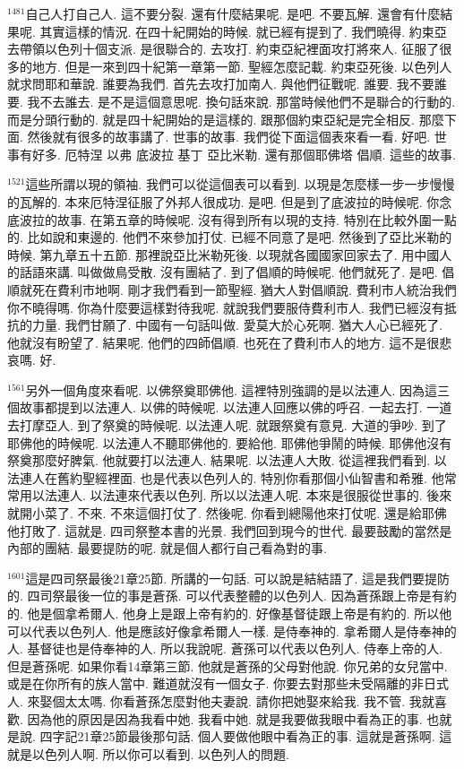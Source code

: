 \documentclass{book}
\begin{document}
$^{1481}$自己人打自己人.
這不要分裂.
還有什麼結果呢.
是吧.
不要瓦解.
還會有什麼結果呢.
其實這樣的情況.
在四十紀開始的時候.
就已經有提到了.
我們曉得.
約束亞去帶領以色列十個支派.
是很聯合的.
去攻打.
約束亞紀裡面攻打將來人.
征服了很多的地方.
但是一來到四十紀第一章第一節.
聖經怎麼記載.
約束亞死後.
以色列人就求問耶和華說.
誰要為我們.
首先去攻打加南人.
與他們征戰呢.
誰要.
我不要誰要.
我不去誰去.
是不是這個意思呢.
換句話來說.
那當時候他們不是聯合的行動的.
而是分頭行動的.
就是四十紀開始的是這樣的.
跟那個約束亞紀是完全相反.
那麼下面.
然後就有很多的故事講了.
世事的故事.
我們從下面這個表來看一看.
好吧.
世事有好多.
厄特涅 以弗 底波拉 基丁 亞比米勒.
還有那個耶佛塔 倡順.
這些的故事.

$^{1521}$這些所謂以現的領袖.
我們可以從這個表可以看到.
以現是怎麼樣一步一步慢慢的瓦解的.
本來厄特涅征服了外邦人很成功.
是吧.
但是到了底波拉的時候呢.
你念底波拉的故事.
在第五章的時候呢.
沒有得到所有以現的支持.
特別在比較外圍一點的.
比如說和東邊的.
他們不來參加打仗.
已經不同意了是吧.
然後到了亞比米勒的時候.
第九章五十五節.
那裡說亞比米勒死後.
以現就各國國家回家去了.
用中國人的話語來講.
叫做做鳥受散.
沒有團結了.
到了倡順的時候呢.
他們就死了.
是吧.
倡順就死在費利市地啊.
剛才我們看到一節聖經.
猶大人對倡順說.
費利市人統治我們你不曉得嗎.
你為什麼要這樣對待我呢.
就說我們要服侍費利市人.
我們已經沒有抵抗的力量.
我們甘願了.
中國有一句話叫做.
愛莫大於心死啊.
猶大人心已經死了.
他就沒有盼望了.
結果呢.
他們的四師倡順.
也死在了費利市人的地方.
這不是很悲哀嗎.
好.

$^{1561}$另外一個角度來看呢.
以佛祭奠耶佛他.
這裡特別強調的是以法連人.
因為這三個故事都提到以法連人.
以佛的時候呢.
以法連人回應以佛的呼召.
一起去打.
一道去打摩亞人.
到了祭奠的時候呢.
以法連人呢.
就跟祭奠有意見.
大道的爭吵.
到了耶佛他的時候呢.
以法連人不聽耶佛他的.
要給他.
耶佛他爭鬧的時候.
耶佛他沒有祭奠那麼好脾氣.
他就要打以法連人.
結果呢.
以法連人大敗.
從這裡我們看到.
以法連人在舊約聖經裡面.
也是代表以色列人的.
特別你看那個小仙智書和希雅.
他常常用以法連人.
以法連來代表以色列.
所以以法連人呢.
本來是很服從世事的.
後來就開小菜了.
不來.
不來這個打仗了.
然後呢.
你看到總陽他來打仗呢.
還是給耶佛他打敗了.
這就是.
四司祭整本書的光景.
我們回到現今的世代.
最要鼓勵的當然是內部的團結.
最要提防的呢.
就是個人都行自己看為對的事.

$^{1601}$這是四司祭最後21章25節.
所講的一句話.
可以說是結結語了.
這是我們要提防的.
四司祭最後一位的事是蒼孫.
可以代表整體的以色列人.
因為蒼孫跟上帝是有約的.
他是個拿希爾人.
他身上是跟上帝有約的.
好像基督徒跟上帝是有約的.
所以他可以代表以色列人.
他是應該好像拿希爾人一樣.
是侍奉神的.
拿希爾人是侍奉神的人.
基督徒也是侍奉神的人.
所以我說呢.
蒼孫可以代表以色列人.
侍奉上帝的人.
但是蒼孫呢.
如果你看14章第三節.
他就是蒼孫的父母對他說.
你兄弟的女兒當中.
或是在你所有的族人當中.
難道就沒有一個女子.
你要去對那些未受隔離的非日式人.
來娶個太太嗎.
你看蒼孫怎麼對他夫妻說.
請你把她娶來給我.
我不管.
我就喜歡.
因為他的原因是因為我看中她.
我看中她.
就是我要做我眼中看為正的事.
也就是說.
四字記21章25節最後那句話.
個人要做他眼中看為正的事.
這就是蒼孫啊.
這就是以色列人啊.
所以你可以看到.
以色列人的問題.
\end{document}
